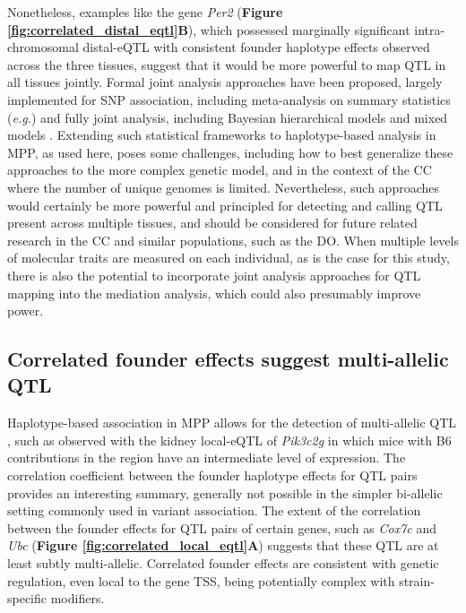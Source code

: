 \documentclass[9pt,twocolumn,twoside]{gsajnl}
\newcommand{\eg}{\emph{e.g.}\xspace}
\begin{document}
Nonetheless, examples like the gene \textit{Per2} (\textbf{Figure \ref{fig:correlated_distal_eqtl}B}), which possessed marginally significant intra-chromosomal distal-eQTL with consistent founder haplotype effects observed across the three tissues, suggest that it would be more powerful to map QTL in all tissues jointly. Formal joint analysis approaches have been proposed, largely implemented for SNP association, including meta-analysis on summary statistics (\eg \citealt{Fu2012a, Sul2013}) and fully joint analysis, including Bayesian hierarchical models \citep{Flutre2013} and mixed models \citep{Acharya2016}. Extending such statistical frameworks to haplotype-based analysis in MPP, as used here, poses some challenges, including how to best generalize these approaches to the more complex genetic model, and in the context of the CC where the number of unique genomes is limited. Nevertheless, such approaches would certainly be more powerful and principled for detecting and calling QTL present across multiple tissues, and should be considered for future related research in the CC and similar populations, such as the DO. When multiple levels of molecular traits are measured on each individual, as is the case for this study, there is also the potential to incorporate joint analysis approaches for QTL mapping into the mediation analysis, which could also presumably improve power.

\subsection{Correlated founder effects suggest multi-allelic QTL}

Haplotype-based association in MPP allows for the detection of multi-allelic QTL \citep{Aylor2011}, such as observed with the kidney local-eQTL of \textit{Pik3c2g} in which mice with B6 contributions in the region have an intermediate level of expression. The correlation coefficient between the founder haplotype effects for QTL pairs provides an interesting summary, generally not possible in the simpler bi-allelic setting commonly used in variant association. The extent of the correlation between the founder effects for QTL pairs of certain genes, such as \textit{Cox7c} and \textit{Ubc} (\textbf{Figure \ref{fig:correlated_local_eqtl}A}) suggests that these QTL are at least subtly multi-allelic. Correlated founder effects are consistent with genetic regulation, even local to the gene TSS, being potentially complex with strain-specific modifiers.
\end{document}
